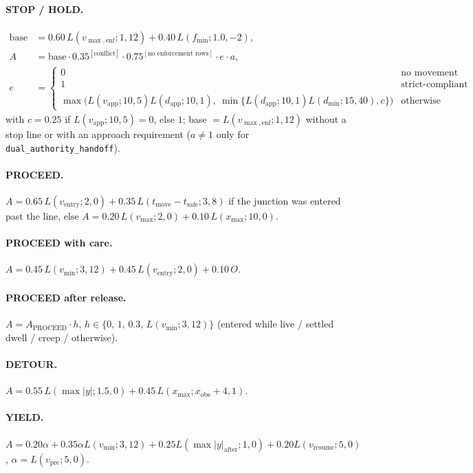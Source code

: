 \documentclass{article}
\begin{document}
\paragraph{STOP / HOLD.}
\begin{align}
\text{base} &= 0.60\,L(v_{\max,\mathrm{enf}};1,12)+0.40\,L(f_{\min};1.0,-2),\\
A &= \text{base}\cdot 0.35^{[\text{conflict}]}\cdot 0.75^{[\text{no enforcement rows}]}\cdot e\cdot a,\\
e &= \begin{cases}0 & \text{no movement evidence}\\ 1 & \text{strict-compliant STOP/HOLD telemetry}\\
\max\!\big(L(v_{\mathrm{app}};10,5)L(d_{\mathrm{app}};10,1),\ \min\{L(d_{\mathrm{app}};10,1)L(d_{\min};15,40),c\}\big) & \text{otherwise}\end{cases}
\end{align}
with $c=0.25$ if $L(v_{\mathrm{app}};10,5)=0$, else $1$; base $=L(v_{\max,\mathrm{enf}};1,12)$ without a stop line or with an approach requirement ($a\ne 1$ only for \texttt{dual\_authority\_handoff}).

\paragraph{PROCEED.}
$A=0.65\,L(v_{\mathrm{entry}};2,0)+0.35\,L(t_{\mathrm{move}}-t_{\mathrm{safe}};3,8)$ if the junction was entered past the line, else $A=0.20\,L(v_{\max};2,0)+0.10\,L(x_{\max};10,0)$.

\paragraph{PROCEED with care.} $A=0.45\,L(v_{\min};3,12)+0.45\,L(v_{\mathrm{entry}};2,0)+0.10\,O$.

\paragraph{PROCEED after release.} $A=A_{\mathrm{PROCEED}}\cdot h$, $h\in\{0,\,1,\,0.3,\,L(v_{\min};3,12)\}$ (entered while live / settled dwell / creep / otherwise).

\paragraph{DETOUR.} $A=0.55\,L(\max|y|;1.5,0)+0.45\,L(x_{\max};x_{\mathrm{obs}}+4,1)$.

\paragraph{YIELD.} $A=0.20\alpha+0.35\alpha L(v_{\min};3,12)+0.25L(\max|y|_{\mathrm{after}};1,0)+0.20L(v_{\mathrm{resume}};5,0)$, $\alpha=L(v_{\mathrm{pre}};5,0)$.
\end{document}
